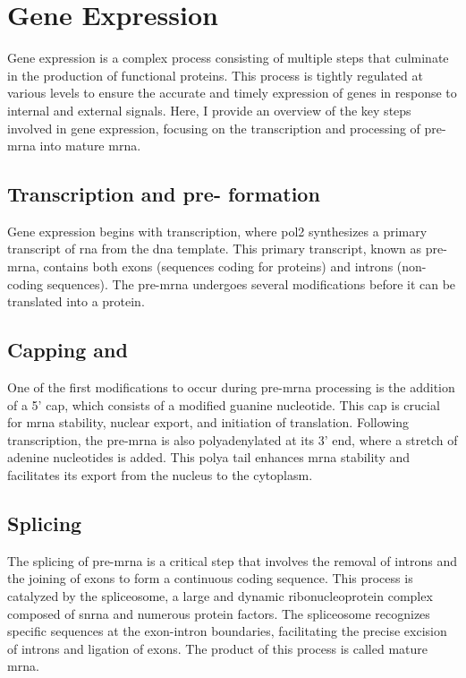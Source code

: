 \section{Gene Expression}
\label{sec:gene_expression}

Gene expression is a complex process consisting of multiple steps that
culminate in the production of functional proteins.
This process is tightly regulated at various levels to ensure the accurate and
timely expression of genes in response to internal and external signals.
Here, I provide an overview of the key steps involved in gene expression,
focusing on the transcription and processing of pre-\gls{mrna} into mature
\gls{mrna}.

\subsection{Transcription and pre- formation}
Gene expression begins with transcription, where \gls{pol2} synthesizes a
primary transcript of \gls{rna} from the \gls{dna} template.
This primary transcript, known as pre-\gls{mrna}, contains both exons
(sequences coding for proteins) and introns (non-coding
sequences)\supercite{lee_mechanisms_2015}.
The pre-\gls{mrna} undergoes several modifications before it can be translated
into a protein.

\subsection{Capping and }
One of the first modifications to occur during pre-\gls{mrna} processing is the
addition of a 5' cap, which consists of a modified guanine nucleotide.
This cap is crucial for \gls{mrna} stability, nuclear export, and initiation of
translation\supercite{topisirovic_cap_2011}.
Following transcription, the pre-\gls{mrna} is also polyadenylated at its 3'
end, where a stretch of adenine nucleotides is added.
This \gls{polya} tail enhances \gls{mrna} stability and facilitates its export
from the nucleus to the cytoplasm\supercite{passmore_roles_2022}.

\subsection{Splicing}
The splicing of pre-\gls{mrna} is a critical step that involves the removal of
introns and the joining of exons to form a continuous coding sequence.
This process is catalyzed by the spliceosome, a large and dynamic
ribonucleoprotein complex composed of \gls{snrna} and numerous protein
factors\supercite{lee_mechanisms_2015}.
The spliceosome recognizes specific sequences at the exon-intron boundaries,
facilitating the precise excision of introns and ligation of exons.
The product of this process is called mature
\gls{mrna}\supercite{wang_splicing_2008}.

